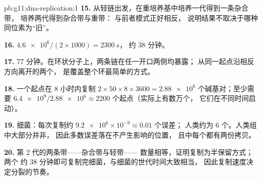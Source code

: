 \begin{solution}{pb:g11:dna-replication:1}
\textbf{15.} 从轻链出发，在重培养基中培养一代得到一条杂合带，
培养两代得到杂合带与重带：
与前者模式正好相反，
说明结果不取决于哪种同位素为“旧”。

\textbf{16.} $\num{4.6e6}/(2 \times 1000) = \qty{2300}{s}$，
约 38 分钟。

\textbf{17.} 77 分钟。在环状分子上，两条链在任一开口两侧均暴露；
从同一起点沿相反方向离开的两个，
是覆盖整个环最简单的方式。

\textbf{18.} 一个起点在 8 小时内复制 $2 \times 50 \times 8 \times 3600 =
\num{2.88e6}$ 个碱基对；至少需要 $\num{6.4e9}/\num{2.88e6}
\approx 2200$ 个起点（实际上有数万个，
它们在不同时间启动）。

\textbf{19.} 细菌：每次复制约 $\num{9.2e6} \times 10^{-9} \approx 0.01$ 个误差；
人类约为 6 个。人类组中大部分并非，
因此多数误差落在不产生影响的位置，
且中每个都有两份拷贝。

\textbf{20.} 第 2 代的两条带——杂合带与轻带——
数量相等，证明复制为半保留方式；两个
约 38 分钟即可复制完细菌，与细菌的世代时间大致相当，
因此复制速度决定分裂的节奏。
\end{solution}
